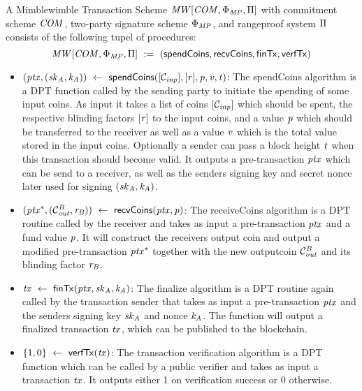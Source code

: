 \begin{definition}
    \label{def:atom:mw-tx-scheme}
    A Mimblewimble Transaction Scheme $\mathit{MW}[\mathit{COM},\Phi_{\mathit{MP}},\Pi]$ with commitment scheme $\mathit{COM}$, two-party signature scheme $\Phi_{\mathit{MP}}$, and rangeproof system $\Pi$ consists of the following tupel of procedures:
    \[ \mathit{MW}[\mathit{COM},\Phi_{\mathit{MP}},\Pi] ~:=~ ( \mathsf{spendCoins},\mathsf{recvCoins},\mathsf{finTx},\mathsf{verfTx} ) \]
    \begin{itemize}
        \item $(\mathit{ptx}, (\mathit{sk}_{\mathit{A}}, \mathit{\mathit{k}_{\mathit{A}}})) ~\leftarrow~ \mathsf{spendCoins}([\mathcal{C}_{\mathit{inp}}],[\mathit{r}],\mathit{p},\mathit{v},\mathit{t})$: The spendCoins algorithm is a DPT function called by the sending party to initiate the spending of some input coins.
        As input it takes a list of coins $[\mathcal{C}_{\mathit{inp}}]$ which should be spent, the respective blinding factors $[\mathit{r}]$ to the input coins, and a value $\mathit{p}$ which should be transferred to the receiver as well as a value $\mathit{v}$ which is the total value stored in the input coins.
        Optionally a sender can pass a block height $\mathit{t}$ when this transaction should become valid.
        It outputs a pre-transaction $\mathit{ptx}$ which can be send to a receiver, as well as the senders signing key and secret nonce later used for signing $(\mathit{sk}_{\mathit{A}}, \mathit{\mathit{k}_{\mathit{A}}})$.
        \item $(\mathit{ptx}^*, (\mathcal{C}_{\mathit{out}}^{\mathit{B}}, \mathit{r}_{\mathit{B}})) ~\leftarrow~ \mathsf{recvCoins}(\mathit{ptx},\mathit{p})$: The receiveCoins algorithm is a DPT routine called by the receiver and takes as input a pre-transaction $\mathit{ptx}$ and a fund value
        $\mathit{p}$. It will construct the receivers output coin and output a modified pre-transaction $\mathit{ptx}^*$ together with the new outputcoin $\mathcal{C}_{\mathit{out}}^{\mathit{B}}$ and its blinding factor $\mathit{r}_{\mathit{B}}$.
        \item $\mathit{tx} ~\leftarrow~ \mathsf{finTx}(\mathit{ptx},\mathit{sk}_{\mathit{A}},\mathit{\mathit{k}_{\mathit{A}}})$: The finalize algorithm is a DPT routine again called by the transaction sender that takes as input a pre-transaction $\mathit{ptx}$ and the senders signing key $\mathit{sk}_{\mathit{A}}$ and nonce $\mathit{\mathit{k}_{\mathit{A}}}$.
        The function will output a finalized transaction $\mathit{tx}$, which can be published to the blockchain.
        \item $\{1,0\} ~\leftarrow~ \mathsf{verfTx}(\mathit{tx})$: The transaction verification algorithm is a DPT function which can be called by a public verifier and takes as input a transaction $\mathit{tx}$. It
        outputs either 1 on verification success or 0 otherwise.
    \end{itemize}
\end{definition}

